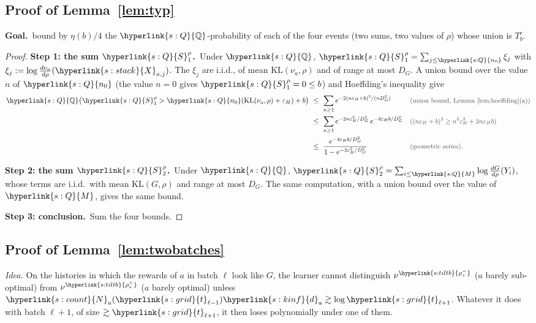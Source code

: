 \documentclass[10pt]{article}
\newcommand{\sy}[2]{{\hyperlink{#1}{#2}}}
\newcommand{\1}{\mathbf{1}}
\newcommand{\KL}{\mathrm{KL}}
\newcommand{\da}{\sy{s:kinf}{d}_a}
\newcommand{\Ng}{\sy{s:count}{N}}
\newcommand{\Xs}{\sy{s:stack}{X}}
\newcommand{\tl}{\sy{s:grid}{t}}
\newcommand{\rhom}{\sy{s:tiltb}{\rho^-_s}}
\newcommand{\rhop}{\sy{s:tiltb}{\rho^+_s}}
\newcommand{\QQ}{\sy{s:Q}{\mathbb Q}}
\newcommand{\nzero}{\sy{s:Q}{n_0}}
\newcommand{\Mb}{\sy{s:Q}{M}}
\newcommand{\Sl}{\sy{s:Q}{S}}
\newcommand{\Goal}{\par\smallskip\noindent\textbf{Goal.}\ }
\newcommand{\stp}[2]{\par\medskip\noindent\textbf{Step #1: #2.}\ }
\newcommand{\why}[1]{\text{\small\color{black!70}(#1)}}
\begin{document}
\subsection{Proof of Lemma~\ref{lem:typ}}\label{sec:pf-lem:typ}
\begin{setgoal}
\Goal bound by $\eta(b)/4$ the $\QQ$-probability of each of the four events (two sums, two values of $\rho$) whose union is $T_b^c$.
\end{setgoal}
\begin{proof}
\stp1{the sum $\Sl_1^\rho$}Under $\QQ$, $\Sl_1^\rho=\sum_{j\le\nzero}\xi_j$ with $\xi_j:=\log\frac{d\nu_a}{d\rho}(\Xs_{a,j})$. The $\xi_j$ are i.i.d., of mean $\KL(\nu_a,\rho)$ and of
range at most $D_G$. A union bound over the value $n$ of $\nzero$ (the value $n=0$ gives $\Sl_1^\rho=0\le b$) and Hoeffding's inequality give
\begin{align*}
\QQ\big(\Sl_1^\rho>\nzero(\KL(\nu_a,\rho)+\varepsilon_H)+b\big)\ &\le\ \sum_{n\ge1}e^{-2(n\varepsilon_H+b)^2/(nD_G^2)}&&\why{union bound, Lemma~\ref{lem:hoeffding}(a)}\\
&\le\ \sum_{n\ge1}e^{-2n\varepsilon_H^2/D_G^2}\,e^{-4\varepsilon_Hb/D_G^2}&&\why{$(n\varepsilon_H+b)^2\ge n^2\varepsilon_H^2+2n\varepsilon_Hb$}\\
&\le\ \frac{e^{-4\varepsilon_Hb/D_G^2}}{1-e^{-2\varepsilon_H^2/D_G^2}}&&\why{geometric series}.
\end{align*}

\stp2{the sum $\Sl_2^\rho$}Under $\QQ$, $\Sl_2^\rho=\sum_{i\le\Mb}\log\frac{dG}{d\rho}(Y_i)$, whose terms are i.i.d.\ with mean $\KL(G,\rho)$ and range at most $D_G$. The same
computation, with a union bound over the value of $\Mb$, gives the same bound.

\stp3{conclusion}Sum the four bounds.
\end{proof}

\subsection{Proof of Lemma~\ref{lem:twobatches}}\label{sec:pf-lem:twobatches}
\noindent\emph{Idea.} On the histories in which the rewards of $a$ in batch $\ell$ look like $G$, the learner cannot distinguish $\nu^{\rhom}$ ($a$ barely sub-optimal) from
$\nu^{\rhop}$ ($a$ barely optimal) unless $\Ng_a(\tl_{\ell-1})\da\gtrsim\log\tl_{\ell+1}$. Whatever it does with batch $\ell+1$, of size $\gtrsim\tl_{\ell+1}$, it then loses
polynomially under one of them.
\end{document}
